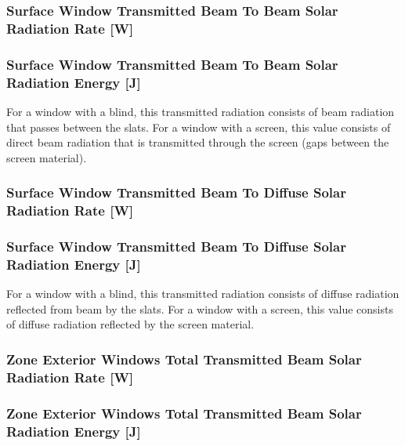 \subsubsection{Surface Window Transmitted Beam To Beam Solar Radiation Rate {[}W{]}}\label{surface-window-transmitted-beam-to-beam-solar-radiation-rate-w}

\subsubsection{Surface Window Transmitted Beam To Beam Solar Radiation Energy {[}J{]}}\label{surface-window-transmitted-beam-to-beam-solar-radiation-energy-j}

For a window with a blind, this transmitted radiation consists of beam radiation that passes between the slats. For a window with a screen, this value consists of direct beam radiation that is transmitted through the screen (gaps between the screen material).

\subsubsection{Surface Window Transmitted Beam To Diffuse Solar Radiation Rate {[}W{]}}\label{surface-window-transmitted-beam-to-diffuse-solar-radiation-rate-w}

\subsubsection{Surface Window Transmitted Beam To Diffuse Solar Radiation Energy {[}J{]}}\label{surface-window-transmitted-beam-to-diffuse-solar-radiation-energy-j}

For a window with a blind, this transmitted radiation consists of diffuse radiation reflected from beam by the slats. For a window with a screen, this value consists of diffuse radiation reflected by the screen material.

\subsubsection{Zone Exterior Windows Total Transmitted Beam Solar Radiation Rate {[}W{]}}\label{zone-exterior-windows-total-transmitted-beam-solar-radiation-rate-w}

\subsubsection{Zone Exterior Windows Total Transmitted Beam Solar Radiation Energy {[}J{]}}\label{zone-exterior-windows-total-transmitted-beam-solar-radiation-energy-j}

